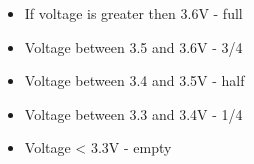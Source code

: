 \begin{itemize}
    \item If voltage is greater then 3.6V - full 
    \item Voltage between 3.5 and 3.6V - 3/4 
    \item Voltage between 3.4 and 3.5V - half 
    \item Voltage between 3.3 and 3.4V - 1/4 
    \item Voltage < 3.3V - empty 
\end{itemize}



%
%
%
%
%
%
%
%
%
%		
%  
